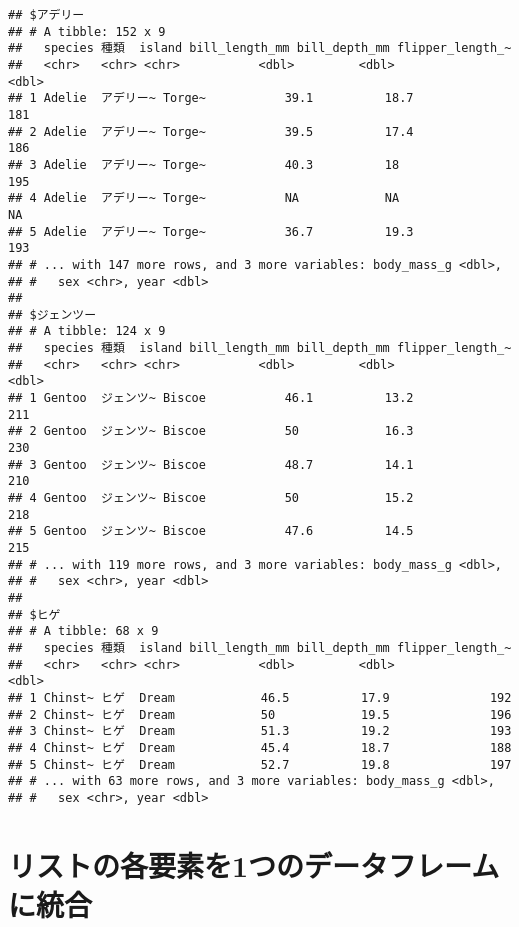 \documentclass[
  xelatex,ja=standard, b5paper]{bxjsbook}
\begin{document}
\begin{verbatim}
## $アデリー
## # A tibble: 152 x 9
##   species 種類  island bill_length_mm bill_depth_mm flipper_length_~
##   <chr>   <chr> <chr>           <dbl>         <dbl>            <dbl>
## 1 Adelie  アデリー~ Torge~           39.1          18.7              181
## 2 Adelie  アデリー~ Torge~           39.5          17.4              186
## 3 Adelie  アデリー~ Torge~           40.3          18                195
## 4 Adelie  アデリー~ Torge~           NA            NA                 NA
## 5 Adelie  アデリー~ Torge~           36.7          19.3              193
## # ... with 147 more rows, and 3 more variables: body_mass_g <dbl>,
## #   sex <chr>, year <dbl>
## 
## $ジェンツー
## # A tibble: 124 x 9
##   species 種類  island bill_length_mm bill_depth_mm flipper_length_~
##   <chr>   <chr> <chr>           <dbl>         <dbl>            <dbl>
## 1 Gentoo  ジェンツ~ Biscoe           46.1          13.2              211
## 2 Gentoo  ジェンツ~ Biscoe           50            16.3              230
## 3 Gentoo  ジェンツ~ Biscoe           48.7          14.1              210
## 4 Gentoo  ジェンツ~ Biscoe           50            15.2              218
## 5 Gentoo  ジェンツ~ Biscoe           47.6          14.5              215
## # ... with 119 more rows, and 3 more variables: body_mass_g <dbl>,
## #   sex <chr>, year <dbl>
## 
## $ヒゲ
## # A tibble: 68 x 9
##   species 種類  island bill_length_mm bill_depth_mm flipper_length_~
##   <chr>   <chr> <chr>           <dbl>         <dbl>            <dbl>
## 1 Chinst~ ヒゲ  Dream            46.5          17.9              192
## 2 Chinst~ ヒゲ  Dream            50            19.5              196
## 3 Chinst~ ヒゲ  Dream            51.3          19.2              193
## 4 Chinst~ ヒゲ  Dream            45.4          18.7              188
## 5 Chinst~ ヒゲ  Dream            52.7          19.8              197
## # ... with 63 more rows, and 3 more variables: body_mass_g <dbl>,
## #   sex <chr>, year <dbl>
\end{verbatim}

\hypertarget{ux30eaux30b9ux30c8ux306eux5404ux8981ux7d20ux30921ux3064ux306eux30c7ux30fcux30bfux30d5ux30ecux30fcux30e0ux306bux7d71ux5408}{%
\section{リストの各要素を1つのデータフレームに統合}\label{ux30eaux30b9ux30c8ux306eux5404ux8981ux7d20ux30921ux3064ux306eux30c7ux30fcux30bfux30d5ux30ecux30fcux30e0ux306bux7d71ux5408}}
\end{document}
